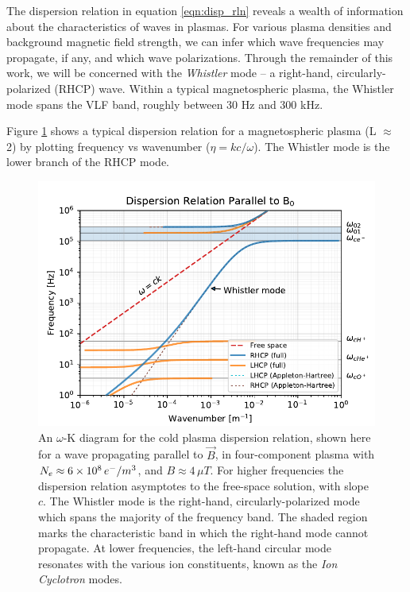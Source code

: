 
The dispersion relation in equation \ref{eqn:disp_rln} reveals a wealth of information about the characteristics of waves in plasmas. For various plasma densities and background magnetic field strength, we can infer which wave frequencies may propagate, if any, and which wave polarizations. Through the remainder of this work, we will be concerned with the \emph{Whistler} mode -- a right-hand, circularly-polarized (RHCP) wave. Within a typical magnetospheric plasma, the Whistler mode spans the VLF band, roughly between 30 Hz and 300 kHz.

Figure \ref{fig:whistler_mode_dispersion} shows a typical dispersion relation for a magnetospheric plasma (L $\approx$ 2) by plotting frequency vs wavenumber ($\eta = k c/\omega$). The Whistler mode is the lower branch of the RHCP mode.
\begin{figure}[ht]
\begin{center}
\includegraphics{figures/omega-k_diagram_parallel}
\caption{An $\omega$-K diagram for the cold plasma dispersion relation, shown here for a wave propagating parallel to $\vec{B}$, in four-component plasma with $N_e \approx  6\times 10^{8}\,e^-/m^3$, and $B\approx 4\,\mu T$. For higher frequencies the dispersion relation asymptotes to the free-space solution, with slope $c$. The Whistler mode is the right-hand, circularly-polarized mode which spans the majority of the frequency band. The shaded region marks the characteristic band in which the right-hand mode cannot propagate. At lower frequencies, the left-hand circular mode resonates with the various ion constituents,  known as the \emph{Ion Cyclotron} modes.}
\label{fig:whistler_mode_dispersion}
\end{center}
\end{figure}